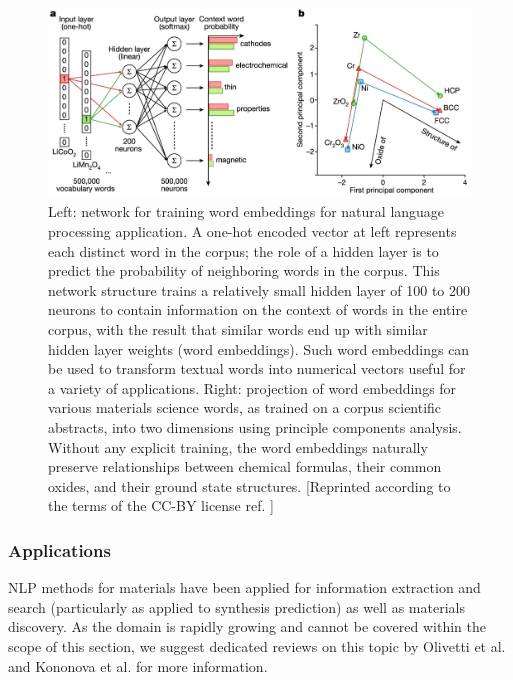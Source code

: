 \documentclass[pdflatex,sn-mathphys]{sn-jnl}%
\theoremstyle{thmstyleone}%
\theoremstyle{thmstyletwo}%
\theoremstyle{thmstylethree}%
\begin{document}
\begin{figure}
    \centering
    \includegraphics[trim={0 .1cm 0 1cm},clip,width=1\textwidth]{Figures/Fig5.PNG}
    \caption{Left: network for training word embeddings for natural language processing application. A one-hot encoded vector at left represents each distinct word in the corpus; the role of a hidden layer is to predict the probability of neighboring words in the corpus. This network structure trains a relatively small hidden layer of 100 to 200 neurons to contain information on the context of words in the entire corpus, with the result that similar words end up with similar hidden layer weights (word embeddings). Such word embeddings can be used to transform textual words into numerical vectors useful for a variety of applications. Right: projection of word embeddings for various materials science words, as trained on a corpus scientific abstracts, into two dimensions using principle components analysis. Without any explicit training, the word embeddings naturally preserve relationships between chemical formulas, their common oxides, and their ground state structures. [Reprinted according to the terms of the CC-BY license ref. \cite{tshitoyan2019unsupervised}]}
\end{figure}

\subsubsection{Applications}
NLP methods for materials have been applied for information extraction and search (particularly as applied to synthesis prediction) as well as materials discovery. As the domain is rapidly growing and cannot be covered within the scope of this section, we suggest dedicated reviews on this topic by Olivetti et al. \cite{olivetti2020data} and Kononova et al. \cite{kononova2021opportunities} for more information.
\end{document}
